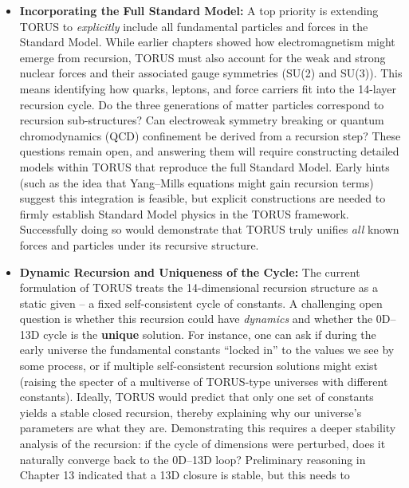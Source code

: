 \documentclass[
]{article}
\begin{document}
{\begin{itemize}
\item
  \textbf{Incorporating the Full Standard Model:} A top priority is
  extending TORUS to \emph{explicitly} include all fundamental particles
  and forces in the Standard Model. While earlier chapters showed how
  electromagnetism might emerge from recursion, TORUS must also account
  for the weak and strong nuclear forces and their associated gauge
  symmetries (SU(2) and SU(3))\hspace{0pt}. This means identifying how
  quarks, leptons, and force carriers fit into the 14-layer recursion
  cycle. Do the three generations of matter particles correspond to
  recursion sub-structures? Can electroweak symmetry breaking or quantum
  chromodynamics (QCD) confinement be derived from a recursion step?
  These questions remain open, and answering them will require
  constructing detailed models within TORUS that reproduce the full
  Standard Model. Early hints (such as the idea that Yang--Mills
  equations might gain recursion terms) suggest this integration is
  feasible, but explicit constructions are needed to firmly establish
  Standard Model physics in the TORUS framework\hspace{0pt}.
  Successfully doing so would demonstrate that TORUS truly unifies
  \emph{all} known forces and particles under its recursive structure.
\item
  \textbf{Dynamic Recursion and Uniqueness of the Cycle:} The current
  formulation of TORUS treats the 14-dimensional recursion structure as
  a static given -- a fixed self-consistent cycle of constants. A
  challenging open question is whether this recursion could have
  \emph{dynamics} and whether the 0D--13D cycle is the \textbf{unique}
  solution. For instance, one can ask if during the early universe the
  fundamental constants ``locked in'' to the values we see by some
  process, or if multiple self-consistent recursion solutions might
  exist (raising the specter of a multiverse of TORUS-type universes
  with different constants)\hspace{0pt}. Ideally, TORUS would predict
  that only one set of constants yields a stable closed recursion,
  thereby explaining why our universe's parameters are what they are.
  Demonstrating this requires a deeper stability analysis of the
  recursion: if the cycle of dimensions were perturbed, does it
  naturally converge back to the 0D--13D loop? Preliminary reasoning in
  Chapter 13 indicated that a 13D closure is stable, but this needs to

\end{itemize}}
\end{document}
